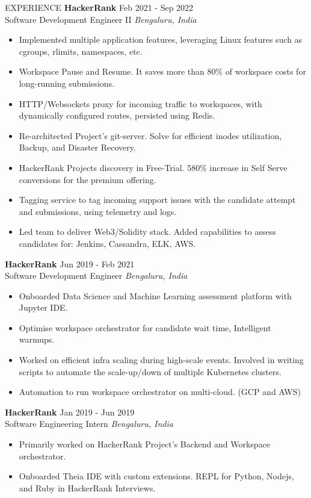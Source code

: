 \documentclass{resume} %
\begin{document}
\begin{rSection}{EXPERIENCE}
\textbf{HackerRank} \hfill Feb 2021 - Sep 2022\\
Software Development Engineer II \hfill \textit{Bengaluru, India}
 \begin{itemize}
    \itemsep -3pt {}
     \item Implemented multiple application features, leveraging Linux features such as cgroups, rlimits, namespaces, etc.
    \item Workspace Pause and Resume. It saves more than 80\% of workspace costs for long-running submissions.
     \item HTTP/Websockets proxy for incoming traffic to workspaces, with dynamically configured routes, persisted using Redis.
     \item Re-architected Project's git-server. Solve for efficient inodes utilization, Backup, and Disaster Recovery.
     \item HackerRank Projects discovery in Free-Trial. 580\% increase in Self Serve conversions for the premium offering.
    \item Tagging service to tag incoming support issues with the candidate attempt and submissions, using telemetry and logs.
    \item Led team to deliver Web3/Solidity stack. Added capabilities to assess candidates for: Jenkins, Cassandra, ELK, AWS.
 \end{itemize}

\textbf{HackerRank} \hfill Jun 2019 - Feb 2021\\
Software Development Engineer \hfill \textit{Bengaluru, India}
 \begin{itemize}
    \itemsep -3pt {}
     \item Onboarded Data Science and Machine Learning assessment platform with Jupyter IDE.
     \item Optimise workspace orchestrator for candidate wait time, Intelligent warmups.
    \item Worked on efficient infra scaling during high-scale events. Involved in writing scripts to automate the scale-up/down of multiple Kubernetes clusters.
    \item Automation to run workspace orchestrator on multi-cloud. (GCP and AWS)
 \end{itemize}

 \textbf{HackerRank} \hfill Jan 2019 - Jun 2019\\
Software Engineering Intern \hfill \textit{Bengaluru, India}
 \begin{itemize}
    \itemsep -3pt {}
     \item Primarily worked on HackerRank Project's Backend and Workspace orchestrator.
     \item Onboarded Theia IDE with custom extensions. REPL for Python, Nodejs, and Ruby in HackerRank Interviews.
 \end{itemize}



\end{rSection}
\end{document}
